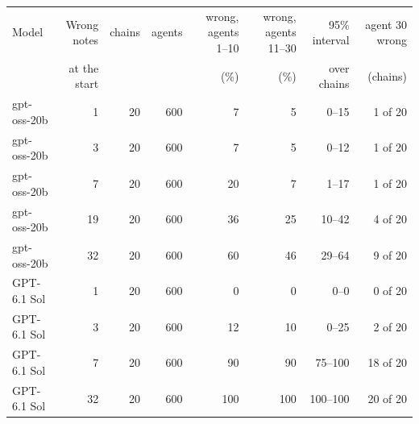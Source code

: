 \begin{tabular}{l r rrrrrr}
\toprule
Model & Wrong notes & chains & agents & wrong, agents 1--10 & wrong, agents 11--30 & 95\% interval & agent 30 wrong \\
 & at the start & & & (\%) & (\%) & over chains & (chains) \\
\midrule
gpt-oss-20b & 1 & 20 & 600 & 7 & 5 & 0--15 & 1 of 20 \\
gpt-oss-20b & 3 & 20 & 600 & 7 & 5 & 0--12 & 1 of 20 \\
gpt-oss-20b & 7 & 20 & 600 & 20 & 7 & 1--17 & 1 of 20 \\
gpt-oss-20b & 19 & 20 & 600 & 36 & 25 & 10--42 & 4 of 20 \\
gpt-oss-20b & 32 & 20 & 600 & 60 & 46 & 29--64 & 9 of 20 \\
GPT-6.1 Sol & 1 & 20 & 600 & 0 & 0 & 0--0 & 0 of 20 \\
GPT-6.1 Sol & 3 & 20 & 600 & 12 & 10 & 0--25 & 2 of 20 \\
GPT-6.1 Sol & 7 & 20 & 600 & 90 & 90 & 75--100 & 18 of 20 \\
GPT-6.1 Sol & 32 & 20 & 600 & 100 & 100 & 100--100 & 20 of 20 \\
\bottomrule
\end{tabular}
